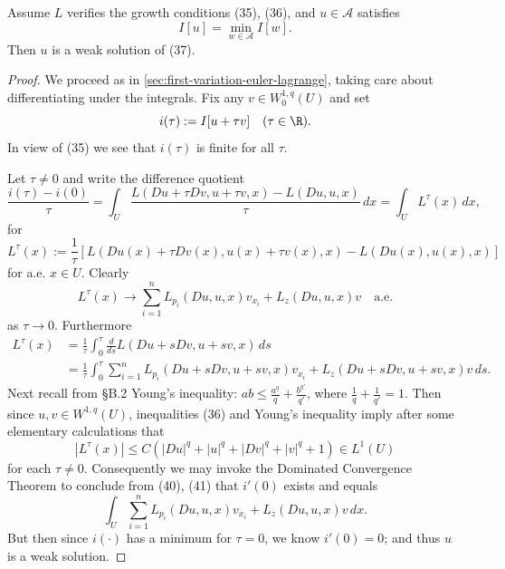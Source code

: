 \begin{theorem}
\label{thm:weak-solution-euler-lagrange-scalar}
Assume $L$ verifies the growth conditions (35), (36), and $u \in \mathcal{A}$ satisfies
\[
I[u] = \min_{w \in \mathcal{A}} I[w].
\]
Then $u$ is a weak solution of (37).
\end{theorem}
\begin{proof}
We proceed as in \cref{sec:first-variation-euler-lagrange}, taking care about differentiating under the integrals. Fix any $v \in W_0^{1,q}(U)$ and set
\[
i(\tau) := I[u+\tau v] \quad (\tau \in \R).
\]
In view of (35) we see that $i(\tau)$ is finite for all $\tau$.

Let $\tau \ne 0$ and write the difference quotient
\[
\frac{i(\tau)-i(0)}{\tau} = \int_U \frac{L(Du+\tau Dv, u+\tau v, x) - L(Du,u,x)}{\tau}\, dx = \int_U L^\tau(x)\, dx,
\tag{40}
\]
for
\[
L^\tau(x) := \frac{1}{\tau}[L(Du(x) + \tau Dv(x), u(x) + \tau v(x), x) - L(Du(x), u(x), x)]
\]
for a.e. $x \in U$. Clearly
\[
L^\tau(x) \to \sum_{i=1}^n L_{p_i}(Du, u, x)v_{x_i} + L_z(Du, u, x)v \quad \text{a.e.}
\tag{41}
\]
as $\tau \to 0$. Furthermore
\[
\begin{aligned}
L^\tau(x) &= \frac{1}{\tau}\int_0^\tau \frac{d}{ds} L(Du + sDv, u + sv, x)\, ds \\
&= \frac{1}{\tau}\int_0^\tau \sum_{i=1}^n L_{p_i}(Du + sDv, u + sv, x)v_{x_i} + L_z(Du + sDv, u + sv, x)v\, ds.
\end{aligned}
\]
Next recall from \S B.2 Young's inequality: $ab \leq \frac{a^q}{q} + \frac{b^{q'}}{q'}$, where $\frac{1}{q} + \frac{1}{q'} = 1$. Then since $u, v \in W^{1,q}(U)$, inequalities (36) and Young's inequality imply after some elementary calculations that
\[
|L^\tau(x)| \leq C(|Du|^q + |u|^q + |Dv|^q + |v|^q + 1) \in L^1(U)
\]
for each $\tau \neq 0$. Consequently we may invoke the Dominated Convergence Theorem to conclude from (40), (41) that $i'(0)$ exists and equals
\[
\int_U \sum_{i=1}^n L_{p_i}(Du, u, x)v_{x_i} + L_z(Du, u, x)v\, dx.
\]
But then since $i(\cdot)$ has a minimum for $\tau = 0$, we know $i'(0) = 0$; and thus $u$ is a weak solution.
\end{proof}

